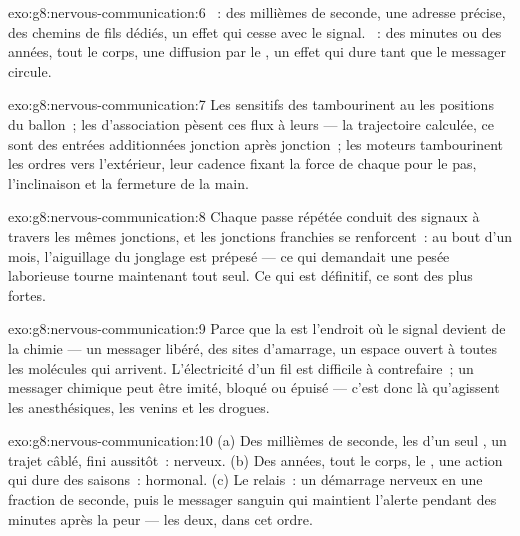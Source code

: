 \begin{solution}{exo:g8:nervous-communication:6}
~: des millièmes de seconde, une adresse précise, des chemins de
fils dédiés, un effet qui cesse avec le signal. ~: des
minutes ou des années, tout le corps, une diffusion par le , un
effet qui dure tant que le messager circule.
\end{solution}

\begin{solution}{exo:g8:nervous-communication:7}
Les  sensitifs des  tambourinent au  les
positions du ballon~; les  d'association pèsent ces flux à
leurs  --- la trajectoire calculée, ce sont des entrées
additionnées jonction après jonction~; les  moteurs
tambourinent les ordres vers l'extérieur, leur cadence fixant la
force de chaque  pour le pas, l'inclinaison et la fermeture de
la main.
\end{solution}

\begin{solution}{exo:g8:nervous-communication:8}
Chaque passe répétée conduit des signaux à travers les mêmes
jonctions, et les jonctions franchies se renforcent~: au bout d'un
mois, l'aiguillage du jonglage est prépesé --- ce qui demandait une
pesée laborieuse tourne maintenant tout seul. Ce qui est définitif,
ce sont des  plus fortes.
\end{solution}

\begin{solution}{exo:g8:nervous-communication:9}
Parce que la  est l'endroit où le signal devient de la chimie
--- un messager libéré, des sites d'amarrage, un espace ouvert à
toutes les molécules qui arrivent. L'électricité d'un fil est
difficile à contrefaire~; un messager chimique peut être imité,
bloqué ou épuisé --- c'est donc là qu'agissent les anesthésiques,
les venins et les drogues.
\end{solution}

\begin{solution}{exo:g8:nervous-communication:10}
(a) Des millièmes de seconde, les  d'un seul , un trajet
câblé, fini aussitôt~: nerveux. (b) Des années, tout le corps, le
, une action qui dure des saisons~: hormonal. (c) Le relais~: un
démarrage nerveux en une fraction de seconde, puis le messager
sanguin qui maintient l'alerte pendant des minutes après la peur ---
les deux, dans cet ordre.
\end{solution}

